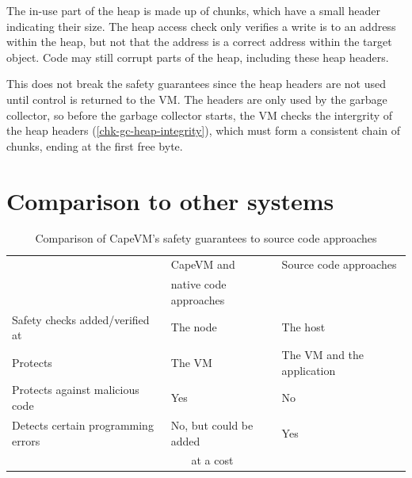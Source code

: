 The in-use part of the heap is made up of chunks, which have a small header indicating their size. The heap access check only verifies a write is to an address within the heap, but not that the address is a correct address within the target object. Code may still corrupt parts of the heap, including these heap headers.

This does not break the safety guarantees since the heap headers are not used until control is returned to the VM. The headers are only used by the garbage collector, so before the garbage collector starts, the VM checks the intergrity of the heap headers (\ref{chk-gc-heap-integrity}), which must form a consistent chain of chunks, ending at the first free byte.



\section{Comparison to other systems}

\begin{table}
\caption{Comparison of CapeVM's safety guarantees to source code approaches}
\label{tbl-safety-comparison-source-code-approaches}
    \begin{tabular}{p{}p{}p{}} %
    \toprule
                                                & CapeVM and                                  & Source code approaches \\
                                                & native code approaches                      & \\
    \midrule
    \midrule
    Safety checks added/verified at             & The node                                    & The host \\
    Protects                                    & The VM                                      & The VM and the application \\
    Protects against malicious code             & Yes                                         & No \\
    Detects certain programming errors          & No, but could be added                      & Yes \\
                                                & ~~~ at a cost                               & \\
    \bottomrule
    \end{tabular}
\end{table}

